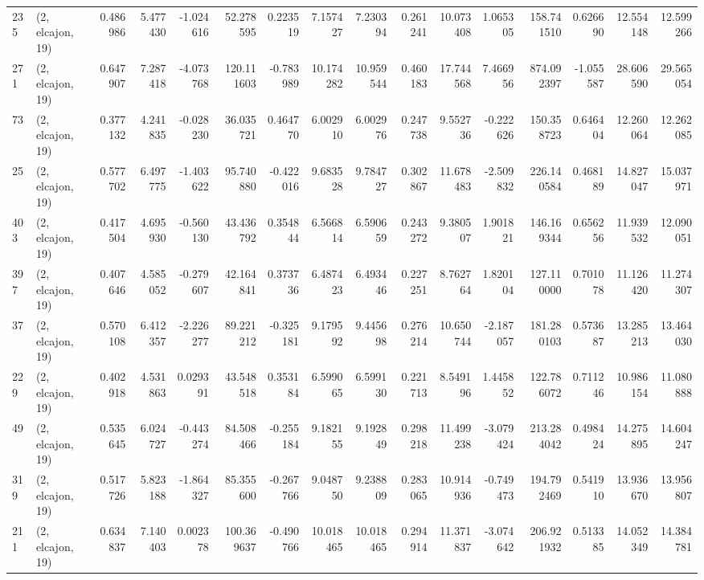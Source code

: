 \begin{tabular}{llrrrrrrrrrrrrrr}
235 &  (2, elcajon, 19) &   0.486986 &   5.477430 &  -1.024616 &    52.278595 &   0.223519 &   7.157427 &   7.230394 &  0.261241 &  10.073408 &   1.065305 &   158.741510 &   0.626690 &  12.554148 &  12.599266 \\
271 &  (2, elcajon, 19) &   0.647907 &   7.287418 &  -4.073768 &   120.111603 &  -0.783989 &  10.174282 &  10.959544 &  0.460183 &  17.744568 &   7.466956 &   874.092397 &  -1.055587 &  28.606590 &  29.565054 \\
73  &  (2, elcajon, 19) &   0.377132 &   4.241835 &  -0.028230 &    36.035721 &   0.464770 &   6.002910 &   6.002976 &  0.247738 &   9.552736 &  -0.222626 &   150.358723 &   0.646404 &  12.260064 &  12.262085 \\
25  &  (2, elcajon, 19) &   0.577702 &   6.497775 &  -1.403622 &    95.740880 &  -0.422016 &   9.683528 &   9.784727 &  0.302867 &  11.678483 &  -2.509832 &   226.140584 &   0.468189 &  14.827047 &  15.037971 \\
403 &  (2, elcajon, 19) &   0.417504 &   4.695930 &  -0.560130 &    43.436792 &   0.354844 &   6.566814 &   6.590659 &  0.243272 &   9.380507 &   1.901821 &   146.169344 &   0.656256 &  11.939532 &  12.090051 \\
397 &  (2, elcajon, 19) &   0.407646 &   4.585052 &  -0.279607 &    42.164841 &   0.373736 &   6.487423 &   6.493446 &  0.227251 &   8.762764 &   1.820104 &   127.110000 &   0.701078 &  11.126420 &  11.274307 \\
37  &  (2, elcajon, 19) &   0.570108 &   6.412357 &  -2.226277 &    89.221212 &  -0.325181 &   9.179592 &   9.445698 &  0.276214 &  10.650744 &  -2.187057 &   181.280103 &   0.573687 &  13.285213 &  13.464030 \\
229 &  (2, elcajon, 19) &   0.402918 &   4.531863 &   0.029391 &    43.548518 &   0.353184 &   6.599065 &   6.599130 &  0.221713 &   8.549196 &   1.445852 &   122.786072 &   0.711246 &  10.986154 &  11.080888 \\
49  &  (2, elcajon, 19) &   0.535645 &   6.024727 &  -0.443274 &    84.508466 &  -0.255184 &   9.182155 &   9.192849 &  0.298218 &  11.499238 &  -3.079424 &   213.284042 &   0.498424 &  14.275895 &  14.604247 \\
319 &  (2, elcajon, 19) &   0.517726 &   5.823188 &  -1.864327 &    85.355600 &  -0.267766 &   9.048750 &   9.238809 &  0.283065 &  10.914936 &  -0.749473 &   194.792469 &   0.541910 &  13.936670 &  13.956807 \\
211 &  (2, elcajon, 19) &   0.634837 &   7.140403 &   0.002378 &   100.369637 &  -0.490766 &  10.018465 &  10.018465 &  0.294914 &  11.371837 &  -3.074642 &   206.921932 &   0.513385 &  14.052349 &  14.384781 \\

\end{tabular}
